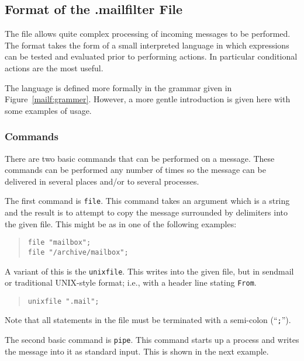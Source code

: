 \subsection{Format of the .mailfilter File}\label{mailfilter}

The  file allows quite complex processing of
incoming messages to be performed. The format takes the form of a
small interpreted language in which expressions can be tested and
evaluated prior to performing actions. In particular conditional
actions are the most useful.

The language is defined more formally in the grammar given in
Figure~\ref{mailf:grammer}. However, a more gentle introduction is
given here with some examples of usage.

\subsubsection{Commands}

There are two basic commands that can be performed on a message. These
commands can be performed any number of times so the message can be
delivered in several places and/or to several processes.

The first command is \verb|file|. This command takes an
argument which is a string and the result is to attempt to copy the
message surrounded by delimiters into the given file. This might be
as in one of the following examples:

\begin{quote}\small\begin{verbatim}
file "mailbox";
file "/archive/mailbox";
\end{verbatim}\end{quote}

A variant of this is the \verb|unixfile|. This writes
into the given file, but in sendmail or traditional UNIX-style format;
i.e., with a header line stating \verb*|From|.

\begin{quote}\small\begin{verbatim}
unixfile ".mail";
\end{verbatim}\end{quote}

Note that all statements in the  file must be
terminated with a semi-colon (``\verb+;+'').

The second basic command is \verb|pipe|. This command
starts up a process and writes the message into it as standard
input. This is shown in the next example.

